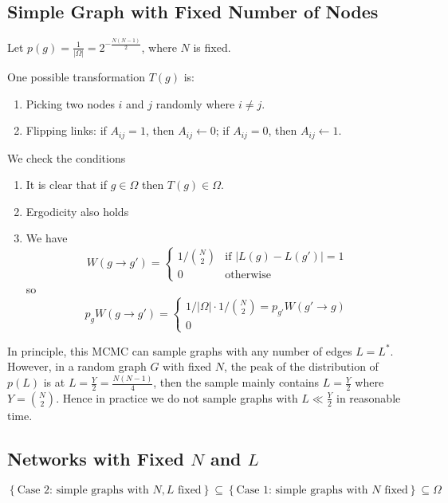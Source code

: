 \documentclass[12pt]{article}
\theoremstyle{definition}
\begin{document}
\subsection{Simple Graph with Fixed Number of Nodes}

Let $p(g)=\frac{1}{|\Omega|}=2^{-\frac{N(N-1)}{2}}$, where $N$ is fixed. 

One possible transformation $T(g)$ is: 
\begin{enumerate}
    \item Picking two nodes $i$ and $j$ randomly where $i\neq j$. 
    \item Flipping links: if $A_{ij}=1$, then $A_{ij}\leftarrow 0$; if $A_{ij}=0$, then $A_{ij}\leftarrow 1$. 
\end{enumerate}

We check the conditions
\begin{enumerate}
    \item It is clear that if $g\in \Omega$ then $T(g)\in \Omega$.
    \item Ergodicity also holds
    \item We have
    \[W(g\to g') = \begin{cases}
    1/\binom N2 & \text{if $|L(g)-L(g')| = 1$}\\ 
        0 & \text{otherwise}
    \end{cases}\]
    so 
    \[ p_g W(g\to g') = \begin{cases}
        1/|\Omega|\cdot  1/\binom N2 = p_{g'}W(g'\to g) \\
        0
    \end{cases}\]
\end{enumerate}

In principle, this MCMC can sample  graphs with any number of edges $L=L^*$. However, in a random graph $G$ with fixed $N$, the peak of the distribution of $p(L)$ is at $L=\frac{Y}{2}=\frac{N(N-1)}{4}$, then the sample mainly contains $L=\frac{Y}{2}$ where $Y=\binom N2$. Hence in practice we do not sample graphs with $L\ll\frac{Y}{2}$ in reasonable time. 

\subsection{Networks with Fixed $N$ and $L$}

\begin{equation*}
    \left\{\text{Case 2: simple graphs with $N,L$ fixed}\right\} \subseteq \left\{\text{Case 1: simple graphs with $N$ fixed}\right\}  \subseteq \Omega
\end{equation*}
\end{document}
